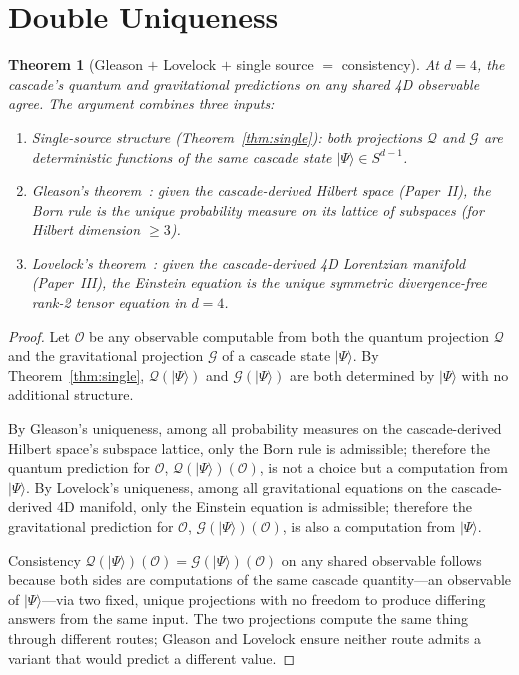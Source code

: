 \documentclass[12pt,a4paper]{article}
\newtheorem{theorem}{Theorem}[section]
\begin{document}
\section{Double Uniqueness}\label{sec:double-uniqueness}

\begin{theorem}[Gleason $+$ Lovelock $+$ single source $=$ consistency]\label{thm:double}
At $d = 4$, the cascade's quantum and gravitational predictions on any
shared 4D observable agree. The argument combines three inputs:
\begin{enumerate}
\item Single-source structure (Theorem~\ref{thm:single}): both
projections $\mathcal{Q}$ and $\mathcal{G}$ are deterministic
functions of the same cascade state $|\Psi\rangle\in S^{d-1}$.
\item Gleason's theorem~\cite{gleason}: given the cascade-derived
Hilbert space (Paper~II), the Born rule is the unique probability
measure on its lattice of subspaces (for Hilbert dimension $\geq 3$).
\item Lovelock's theorem~\cite{lovelock}: given the cascade-derived
4D Lorentzian manifold (Paper~III), the Einstein equation is the unique
symmetric divergence-free rank-2 tensor equation in $d = 4$.
\end{enumerate}
\end{theorem}

\begin{proof}
Let $\mathcal{O}$ be any observable computable from both the quantum
projection $\mathcal{Q}$ and the gravitational projection
$\mathcal{G}$ of a cascade state $|\Psi\rangle$. By
Theorem~\ref{thm:single}, $\mathcal{Q}(|\Psi\rangle)$ and
$\mathcal{G}(|\Psi\rangle)$ are both determined by $|\Psi\rangle$ with no
additional structure.

By Gleason's uniqueness, among all probability measures on the
cascade-derived Hilbert space's subspace lattice, only the Born rule is
admissible; therefore the quantum prediction for $\mathcal{O}$,
$\mathcal{Q}(|\Psi\rangle)(\mathcal{O})$, is not a choice but a
computation from $|\Psi\rangle$. By Lovelock's uniqueness, among all
gravitational equations on the cascade-derived 4D manifold, only the
Einstein equation is admissible; therefore the gravitational prediction
for $\mathcal{O}$, $\mathcal{G}(|\Psi\rangle)(\mathcal{O})$, is also a
computation from $|\Psi\rangle$.

Consistency $\mathcal{Q}(|\Psi\rangle)(\mathcal{O})
= \mathcal{G}(|\Psi\rangle)(\mathcal{O})$ on any shared observable
follows because both sides are computations of the same cascade
quantity---an observable of $|\Psi\rangle$---via two fixed, unique
projections with no freedom to produce differing answers from the same
input. The two projections compute the same thing through different
routes; Gleason and Lovelock ensure neither route admits a variant that
would predict a different value.
\end{proof}
\end{document}
